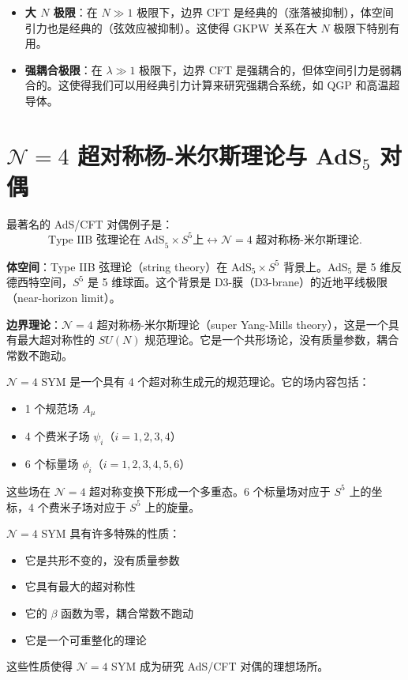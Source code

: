 \begin{property}[强弱对偶的具体表现]
\begin{itemize}
    \item \textbf{大 $N$ 极限}：在 $N \gg 1$ 极限下，边界 CFT 是经典的（涨落被抑制），体空间引力也是经典的（弦效应被抑制）。这使得 GKPW 关系在大 $N$ 极限下特别有用。
    \item \textbf{强耦合极限}：在 $\lambda \gg 1$ 极限下，边界 CFT 是强耦合的，但体空间引力是弱耦合的。这使得我们可以用经典引力计算来研究强耦合系统，如 QGP 和高温超导体。
\end{itemize}
\end{property}

\section{$\mathcal{N}=4$ 超对称杨-米尔斯理论与 AdS$_5$ 对偶}

最著名的 AdS/CFT 对偶例子是：
\begin{equation}
    \text{Type IIB 弦理论在 AdS}_5 \times S^5 \text{上}
    \longleftrightarrow
    \text{$\mathcal{N}=4$ 超对称杨-米尔斯理论}.
\end{equation}

\textbf{体空间}：Type IIB 弦理论（string theory）在 AdS$_5 \times S^5$ 背景上。AdS$_5$ 是 5 维反德西特空间，$S^5$ 是 5 维球面。这个背景是 D3-膜（D3-brane）的近地平线极限（near-horizon limit）。

\textbf{边界理论}：$\mathcal{N}=4$ 超对称杨-米尔斯理论（super Yang-Mills theory），这是一个具有最大超对称性的 $SU(N)$ 规范理论。它是一个共形场论，没有质量参数，耦合常数不跑动。

\begin{definition}[$\mathcal{N}=4$ 超对称杨-米尔斯理论]
$\mathcal{N}=4$ SYM 是一个具有 4 个超对称生成元的规范理论。它的场内容包括：
\begin{itemize}
    \item 1 个规范场 $A_\mu$
    \item 4 个费米子场 $\psi_i$（$i=1,2,3,4$）
    \item 6 个标量场 $\phi_i$（$i=1,2,3,4,5,6$）
\end{itemize}
这些场在 $\mathcal{N}=4$ 超对称变换下形成一个多重态。6 个标量场对应于 $S^5$ 上的坐标，4 个费米子场对应于 $S^5$ 上的旋量。
\end{definition}

\begin{remark}[$\mathcal{N}=4$ SYM 的特殊性质]
$\mathcal{N}=4$ SYM 具有许多特殊的性质：
\begin{itemize}
    \item 它是共形不变的，没有质量参数
    \item 它具有最大的超对称性
    \item 它的 $\beta$ 函数为零，耦合常数不跑动
    \item 它是一个可重整化的理论
\end{itemize}
这些性质使得 $\mathcal{N}=4$ SYM 成为研究 AdS/CFT 对偶的理想场所。
\end{remark}

